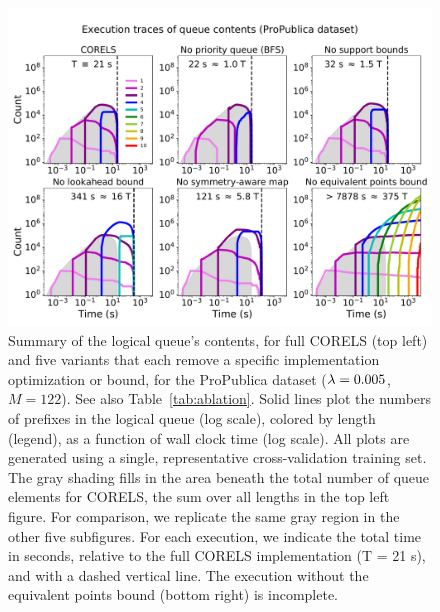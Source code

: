 \begin{figure}[t!]
\begin{center}
\includegraphics[trim={0mm 0mm 0mm 15mm}, width=\textwidth]{figs/jmlr_compas_ablation-queue.pdf}
\end{center}
\vspace{-5mm}
\caption{Summary of the logical queue's contents, for full CORELS (top left)
and five variants that each remove a specific implementation optimization or bound,
for the ProPublica dataset (${{\lambda} = 0.005}$, ${M = 122}$).  See also Table~\ref{tab:ablation}.
%
Solid lines plot the numbers of prefixes in the logical queue (log scale), colored by length (legend),
as a function of wall clock time (log scale).
%
All plots are generated using a single, representative cross-validation training set.
%
The gray shading fills in the area beneath the total number of
queue elements for CORELS,
\ie the sum over all lengths in the top left figure.
%
For comparison, we replicate the same gray region
in the other five subfigures.
%
For each execution, we indicate the total time in seconds,
relative to the full CORELS implementation (T = 21 s),
and with a dashed vertical line.
%
The execution without the equivalent points bound (bottom right) is incomplete.
}
\label{fig:queue}
\end{figure}

